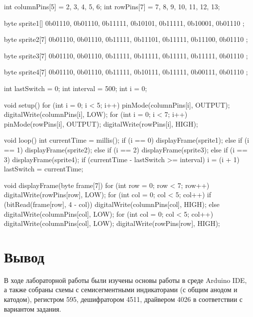 \documentclass[a4paper,14pt]{extarticle}
\begin{document}
  int columnPins[5] = {2, 3, 4, 5, 6};
int rowPins[7] = {7, 8, 9, 10, 11, 12, 13};

byte sprite1[] {
  0b01110,
  0b01110,
  0b11111,
  0b10101,
  0b11111,
  0b10001,
  0b01110
};

byte sprite2[7] {
  0b01110,
  0b01110,
  0b11111,
  0b11101,
  0b11111,
  0b11100,
  0b01110
};

byte sprite3[7] {
  0b01110,
  0b01110,
  0b11111,
  0b11111,
  0b11111,
  0b11111,
  0b01110
};

byte sprite4[7] {
  0b01110,
  0b01110,
  0b11111,
  0b10111,
  0b11111,
  0b00111,
  0b01110
};

int lastSwitch = 0;
int interval = 500;
int i = 0;

void setup() {
  for (int i = 0; i < 5; i++) {
    pinMode(columnPins[i], OUTPUT);
    digitalWrite(columnPins[i], LOW);
  }
  for (int i = 0; i < 7; i++) {
    pinMode(rowPins[i], OUTPUT);
    digitalWrite(rowPins[i], HIGH);
  }
}

void loop() {
  int currentTime = millis();
  if (i == 0) {
    displayFrame(sprite1);
  } else if (i == 1) {
    displayFrame(sprite2);
  } else if (i == 2) {
    displayFrame(sprite3);
  } else if (i == 3) {
    displayFrame(sprite4);
  }
  if (currentTime - lastSwitch >= interval) {
    i = (i + 1) %
    lastSwitch = currentTime;
  }
}

void displayFrame(byte frame[7]) {
  for (int row = 0; row < 7; row++) {
    digitalWrite(rowPins[row], LOW);
    for (int col = 0; col < 5; col++) {
      if (bitRead(frame[row], 4 - col)) {
        digitalWrite(columnPins[col], HIGH);
      } else {
        digitalWrite(columnPins[col], LOW);
      }
    }
    for (int col = 0; col < 5; col++) {
      digitalWrite(columnPins[col], LOW);
    }
    digitalWrite(rowPins[row], HIGH);
  }
}

  \section*{\hspace{12.5mm}Вывод}
  В ходе лабораторной работы были изучены основы работы в среде Arduino IDE, а также собраны схемы с семисегментными индикаторами (с общим анодом и катодом), регистром 595, дешифратором 4511, драйвером 4026 в соответствии с вариантом задания.
 
\end{document}
